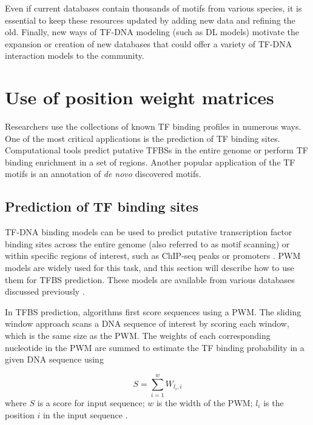   Even if current databases contain thousands of motifs from various species, it is essential to keep these resources updated by adding new data and refining the old. Finally, new ways of TF-DNA modeling (such as DL models) motivate the expansion or creation of new databases that could offer a variety of TF-DNA interaction models to the community.

  \section{Use of position weight matrices}

  Researchers use the collections of known TF binding profiles in numerous ways. One of the most critical applications is the prediction of TF binding sites. Computational tools predict putative TFBSs in the entire genome or perform TF binding enrichment in a set of regions. Another popular application of the TF motifs is an annotation of \textit{de novo} discovered motifs.

    \subsection{Prediction of TF binding sites}

    TF-DNA binding models can be used to predict putative transcription factor binding sites across the entire genome (also referred to as motif scanning) or within specific regions of interest, such as ChIP-seq peaks or promoters \cite{boeva2016analysis}. PWM models are widely used for this task, and this section will describe how to use them for TFBS prediction. These models are available from various databases discussed previously \cite{rauluseviciute2024jaspar,matys2006transfac,wingender2008transfac}.

    In TFBS prediction, algorithms first score sequences using a PWM. The sliding window approach scans a DNA sequence of interest by scoring each window, which is the same size as the PWM. The weights of each corresponding nucleotide in the PWM are summed to estimate the TF binding probability in a given DNA sequence using

    \begin{equation}
      S=\sum\limits_{i=1}^{w}W_{l_{i},i}
      \label{scoring}
    \end{equation}
    where $ S $ is a score for input sequence; $ w $ is the width of the PWM; $ l_{i} $ is the position $ i $ in the input sequence \cite{wasserman2004applied}.

